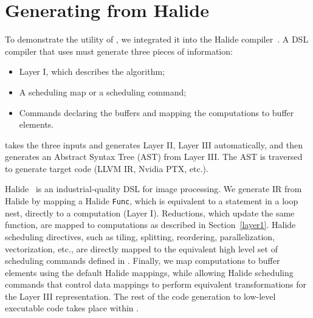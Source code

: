 \section{Generating \framework{} from Halide}

To demonstrate the utility of \framework{}, we integrated it into the Halide compiler~\cite{halide_12}.
A DSL compiler that uses \framework{} must generate three pieces of information:
\begin{itemize}
    \item Layer I, which describes the algorithm;
    \item A scheduling map or a scheduling command;
    \item Commands declaring the buffers and mapping the computations to buffer elements.
\end{itemize}
\framework takes the three inputs and generates Layer II, Layer III automatically, and then generates an Abstract Syntax Tree (AST) from Layer III. The AST is traversed to generate target code (LLVM IR, Nvidia PTX, etc.).

Halide~\cite{halide_12} is an industrial-quality DSL for image processing.
We generate \framework{} IR from Halide by mapping a Halide \lstinline{Func}, which is equivalent to a statement in a loop nest,  directly to a \framework{} computation (Layer I).  Reductions, which update the same function, are mapped to \framework computations as described in Section~\ref{layer1}.  Halide scheduling directives, such as tiling, splitting, reordering, parallelization, vectorization, etc., are directly mapped to the equivalent high level set of scheduling commands defined in \framework.  Finally, we map computations to buffer elements using the default Halide mappings, while allowing Halide scheduling commands that control data mappings to perform equivalent transformations for the Layer III representation.
The rest of the code generation to low-level executable code takes place within \framework{}.
